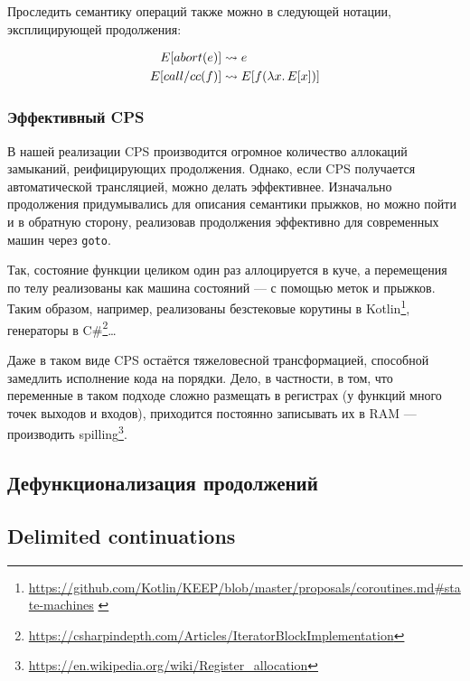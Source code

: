 
Проследить семантику операций также можно в следующей нотации, эксплицирующей продолжения:

\begin{align*}
    E[abort(e)] &\rightsquigarrow e\\
    E[call/cc(f)] &\rightsquigarrow E[f(\lambda x\ldotp E[x])]
\end{align*}

\subsubsection{Эффективный CPS}

В нашей реализации CPS производится огромное количество аллокаций замыканий, реифицирующих продолжения.
Однако, если CPS получается автоматической трансляцией, можно делать эффективнее.
Изначально продолжения придумывались для описания семантики прыжков, но можно пойти и в обратную сторону, реализовав продолжения эффективно для современных машин через \texttt{goto}.

Так, состояние функции целиком один раз аллоцируется в куче, а перемещения по телу реализованы как машина состояний --- с помощью меток и прыжков.
Таким образом, например, реализованы безстековые корутины в Kotlin\footnote{\url{https://github.com/Kotlin/KEEP/blob/master/proposals/coroutines.md\#state-machines} \label{note:kotlin-state}}, генераторы в C\#\footnote{\url{https://csharpindepth.com/Articles/IteratorBlockImplementation}}\ldots

Даже в таком виде CPS остаётся тяжеловесной трансформацией, способной замедлить исполнение кода на порядки.
Дело, в частности, в том, что переменные в таком подходе сложно размещать в регистрах (у функций много точек выходов и входов), приходится постоянно записывать их в RAM --- производить spilling\footnote{\url{https://en.wikipedia.org/wiki/Register_allocation}}.

\subsection{Дефункционализация продолжений}

\cite{reynolds1972definitional}




\subsection{Delimited continuations}

